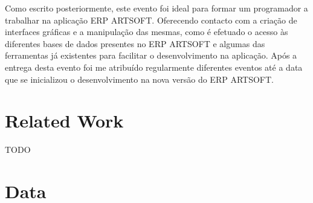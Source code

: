 \documentclass[sigplan]{acmart}
\begin{document}
\FloatBarrier

Como escrito posteriormente, este evento foi ideal para formar um programador a trabalhar na aplicação ERP ARTSOFT. Oferecendo contacto com a criação de interfaces gráficas e a manipulação das mesmas, como é efetuado o acesso às diferentes bases de dados presentes no ERP ARTSOFT e algumas das ferramentas já existentes para facilitar o desenvolvimento na aplicação. Após a entrega desta evento foi me atribuído regularmente diferentes eventos até a data que se inicializou o desenvolvimento na nova versão do ERP ARTSOFT.

\section{Related Work} \label{sec:relatedwork}

TODO





\section{Data} \label{sec:data}
\end{document}
